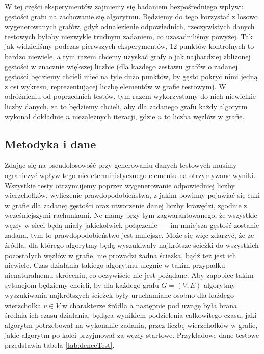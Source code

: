 W tej części eksperymentów zajmiemy się badaniem bezpośredniego wpływu gęstości grafu na zachowanie się algorytmu. Będziemy do tego korzystać z losowo wygenerowanych grafów, gdyż odnalezienie odpowiednich, rzeczywistych danych testowych byłoby niezwykle trudnym zadaniem, co uzasadniliśmy powyżej. Tak jak widzieliśmy podczas pierwszych eksperymentów, $12$ punktów kontrolnych to bardzo niewiele, a tym razem chcemy uzyskać grafy o jak najbardziej zbliżonej gęstości w znacznie większej liczbie (dla każdego zestawu grafów o zadanej gęstości będziemy chcieli mieć na tyle dużo punktów, by gęsto pokryć nimi jedną z osi wykresu, reprezentującej liczbę elementów w grafie testowym). W odróżnieniu od poprzednich testów, tym razem wykorzystamy do nich niewielkie liczby danych, za to będziemy chcieli, aby dla zadanego grafu każdy algorytm wykonał dokładnie $n$ niezależnych iteracji, gdzie $n$ to liczba węzłów w grafie.

\subsection{Metodyka i dane}

Zdając się na pseudolosowość przy generowaniu danych testowych musimy ograniczyć wpływ tego niedeterministycznego elementu na otrzymywane wyniki. Wszystkie testy otrzymujemy poprzez wygenerowanie odpowiedniej liczby wierzchołków, wyliczenie prawdopodobieństwa, z jakim powinny pojawiać się łuki w grafie dla zadanej gęstości oraz utworzenie danej liczby krawędzi, zgodnie z wcześniejszymi rachunkami. Ne mamy przy tym zagwarantowanego, że wszystkie węzły w sieci będą miały jakiekolwiek połączenie~--- im mniejsza gęstość zostanie zadana, tym to prawdopodobieństwo jest mniejsze. Może się więc zdarzyć, że ze źródła, dla którego algorytmy będą wyszukiwały najkrótsze ścieżki do wszystkich pozostałych węzłów w grafie, nie prowadzi żadna ścieżka, bądź też jest ich niewiele. Czas działania takiego algorytmu ulegnie w takim przypadku nienaturalnemu skróceniu, co oczywiście nie jest pożądane. Aby zapobiec takim sytuacjom będziemy chcieli, by dla każdego grafu $ G = \left( V, E \right) $ algorytmy wyszukiwania najkrótszych ścieżek były uruchamiane osobno dla każdego wierzchołka $v \in V$ w charakterze źródła a następnie pod uwagę była brana średnia ich czasu działania, będąca wynikiem podzielenia całkowitego czasu, jaki algorytm potrzebował na wykonanie zadania, przez liczbę wierzchołków w grafie, jakie algorytm po kolei przyjmował za węzły startowe. Przykładowe dane testowe przedstawia tabela \ref{tab:denceTest}.

